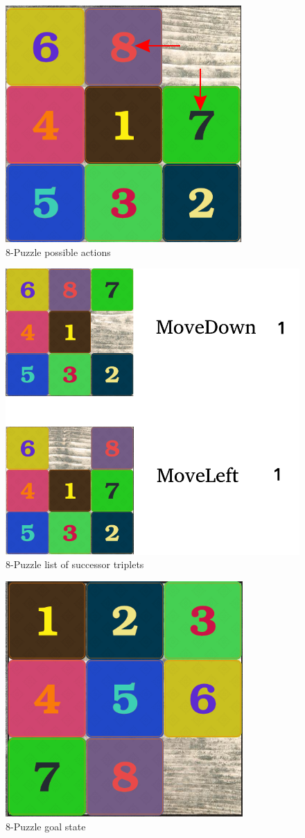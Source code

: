 \documentclass{beamer}
\begin{document}
\begin{frame}
\begin{figure}
\centering
	\includegraphics[width=0.5\linewidth]{puzzle8_arrows.png}
	\caption{8-Puzzle possible actions}
\end{figure}
\end{frame}

\begin{frame}
\begin{figure}
\centering
	\includegraphics[width=0.5\linewidth]{puzzle8_successors.png}
	\caption{8-Puzzle list of successor triplets}
\end{figure}
\end{frame}

\begin{frame}
\begin{figure}
\centering
	\includegraphics[width=0.5\linewidth]{puzzle8_goal.png}
	\caption{8-Puzzle goal state}
\end{figure}
\end{frame}
\end{document}
